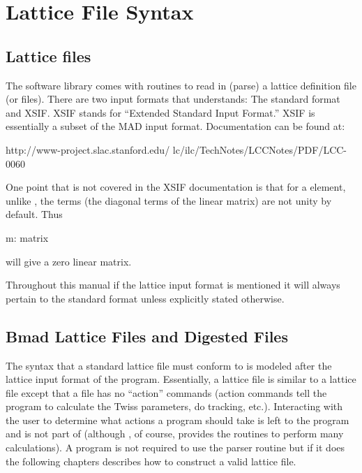\chapter{Lattice File Syntax}

\section{Lattice files}
\label{s:lattice_file_formats}

The \bmad software library comes with routines to read in (parse) a
lattice definition file (or files). There are two input formats that
\bmad understands: The \bmad standard format and
XSIF\cite{b:xsif}. XSIF stands for ``Extended Standard Input Format.''
XSIF is essentially a subset of the MAD input format. Documentation
can be found at:
\begin{example}
  http://www-project.slac.stanford.edu/
              lc/ilc/TechNotes/LCCNotes/PDF/LCC-0060%
\end{example}
One point that is not covered in the XSIF documentation is that for a
 element, unlike \MAD, the  terms (the diagonal
terms of the linear matrix) are not unity by default. Thus
\begin{example}
  m: matrix
\end{example}
will give a zero linear matrix.

Throughout this manual if the lattice input format is mentioned it
will always pertain to the \bmad standard format unless explicitly
stated otherwise.

\section{Bmad Lattice Files and Digested Files}
\label{s:lattice_files}

The syntax that a \bmad standard lattice file
must conform to is modeled after the lattice input format of the \MAD
program.  Essentially, a \bmad lattice file is similar to a \mad
lattice file except that a \bmad file has no ``action'' commands
(action commands tell the program to calculate the Twiss parameters,
do tracking, etc.). 
Interacting with the user to determine what actions a program
should take is left to the program and is not part of \bmad (although
\bmad, of course, provides the routines to perform many calculations). A
program is not required to use the \bmad parser routine but if it
does the following chapters describes how to construct a valid lattice
file.

